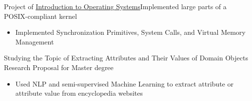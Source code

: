 {Project of \href{http://www.ops-class.org/asst/}{Introduction to Operating Systems}}{Implemented large parts of a POSIX-compliant kernel}{}{}
{
  \begin{itemize}
      \item Implemented Synchronization Primitives, System Calls, and Virtual Memory Management
  \end{itemize}
}

{Studying the Topic of Extracting Attributes and Their Values of Domain Objects}
{Research Proposal for Master degree}{}{}
{
  \begin{itemize}
      \item Used NLP and semi-supervised Machine Learning to extract attribute or attribute value from encyclopedia websites
  \end{itemize}
}

